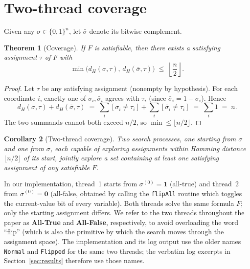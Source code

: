 \documentclass[11pt]{article}
\newtheorem{theorem}{Theorem}
\newtheorem{corollary}[theorem]{Corollary}
\begin{document}
\section{Two-thread coverage}
\label{sec:coverage}

Given any $\sigma \in \{0,1\}^n$, let $\bar\sigma$ denote its bitwise
complement.

\begin{theorem}[Coverage]
\label{thm:coverage}
If $F$ is satisfiable, then there exists a satisfying assignment
$\tau$ of $F$ with
\[
\min\bigl( d_H(\sigma, \tau),\, d_H(\bar\sigma, \tau) \bigr)
\;\le\; \left\lfloor \frac{n}{2} \right\rfloor.
\]
\end{theorem}
\begin{proof}
Let $\tau$ be any satisfying assignment (nonempty by hypothesis). For
each coordinate $i$, exactly one of $\sigma_i, \bar\sigma_i$ agrees
with $\tau_i$ (since $\bar\sigma_i = 1-\sigma_i$). Hence
\[
d_H(\sigma, \tau) + d_H(\bar\sigma, \tau)
   \;=\; \sum_i [\sigma_i \ne \tau_i] + \sum_i [\bar\sigma_i \ne \tau_i]
   \;=\; \sum_i 1 \;=\; n.
\]
The two summands cannot both exceed $n/2$, so
$\min \le \lfloor n/2 \rfloor$.
\end{proof}

\begin{corollary}[Two-thread coverage]
\label{cor:twoThread}
Two search processes, one starting from $\sigma$ and one from
$\bar\sigma$, each capable of exploring assignments within Hamming
distance $\lfloor n/2 \rfloor$ of its start, jointly explore a set
containing at least one satisfying assignment of any satisfiable $F$.
\end{corollary}

\medskip
\noindent In our implementation, thread~1 starts from
$\sigma^{(0)} = \mathbf{1}$ (all-true) and thread~2 from
$\bar\sigma^{(0)} = \mathbf{0}$ (all-false, obtained by calling the
\texttt{flipAll} routine which toggles the current-value bit of every
variable). Both threads solve the same formula $F$; only the starting
assignment differs. We refer to the two threads throughout the
paper as \textbf{All-True} and \textbf{All-False}, respectively,
to avoid overloading the word ``flip'' (which is also the primitive
by which the search moves through the assignment space). The
implementation and its log output use the older names
\texttt{Normal} and \texttt{Flipped} for the same two threads; the
verbatim log excerpts in Section~\ref{sec:results} therefore use
those names.
\end{document}

